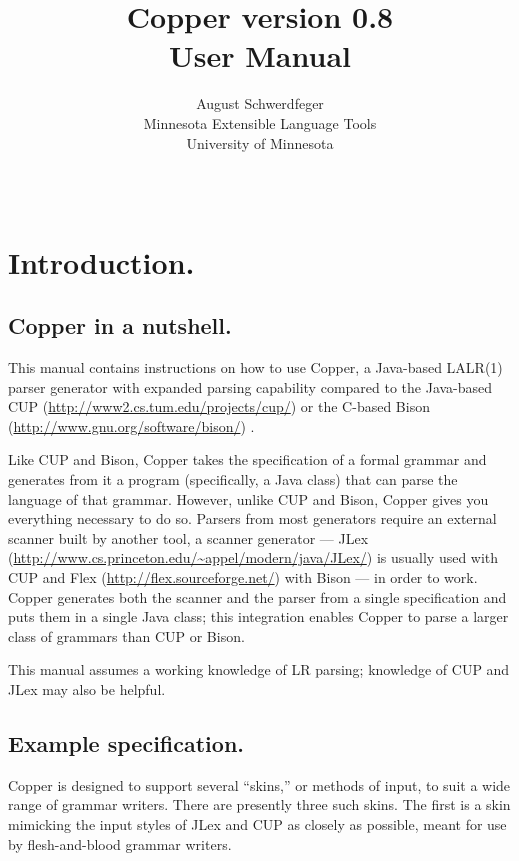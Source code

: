 \documentclass[12pt,english,twoside]{report}
\begin{document}
\title{\textbf{Copper version 0.8\\
User Manual}}


\author{August Schwerdfeger\\
Minnesota Extensible Language Tools\\
University of Minnesota}


\date{~}

\maketitle
\tableofcontents{}

\chapter{Introduction.}


\section{Copper in a nutshell.}

This manual contains instructions on how to use Copper, a Java-based
LALR(1) parser generator with expanded parsing capability compared
to the Java-based CUP (\url{http://www2.cs.tum.edu/projects/cup/})
or the C-based Bison (\url{http://www.gnu.org/software/bison/}) .

Like CUP and Bison, Copper takes the specification of a formal grammar
and generates from it a program (specifically, a Java class) that
can parse the language of that grammar. However, unlike CUP and Bison,
Copper gives you everything necessary to do so. Parsers from most
generators require an external scanner built by another tool, a scanner
generator --- JLex (\url{http://www.cs.princeton.edu/~appel/modern/java/JLex/})
is usually used with CUP and Flex (\url{http://flex.sourceforge.net/})
with Bison --- in order to work. Copper generates both the scanner
and the parser from a single specification and puts them in a single
Java class; this integration enables Copper to parse a larger class
of grammars than CUP or Bison.

This manual assumes a working knowledge of LR parsing; knowledge of
CUP and JLex may also be helpful.

\section{Example specification.}

Copper is designed to support several {}``skins,'' or methods of
input, to suit a wide range of grammar writers. There are presently
three such skins. The first is a skin mimicking the input styles of
JLex and CUP as closely as possible, meant for use by flesh-and-blood
grammar writers.
\end{document}
